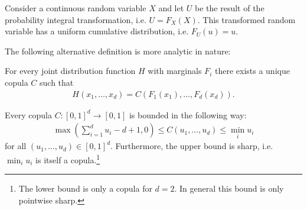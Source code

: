     \begin{property}
        Consider a continuous random variable $X$ and let $U$ be the result of the probability integral transformation, i.e. $U = F_X(X)$. This transformed random variable has a uniform cumulative distribution, i.e. $F_U(u) = u$.
    \end{property}

    The following alternative definition is more analytic in nature:

    \begin{theorem}[Sklar]
        For every joint distribution function $H$ with marginals $F_i$ there exists a unique copula $C$ such that
        \begin{gather}
            H(x_1,\ldots,x_d) = C(F_1(x_1),\ldots,F_d(x_d)).
        \end{gather}
    \end{theorem}

    \begin{property}
        Every copula $C:[0,1]^d\rightarrow[0,1]$ is bounded in the following way:
        \begin{gather}
            \max\left(\sum_{i=1}^du_i-d+1,0\right)\leq C(u_1,\ldots,u_d)\leq \min_iu_i
        \end{gather}
        for all $(u_1,\ldots,u_d)\in[0,1]^d$. Furthermore, the upper bound is sharp, i.e. $\min_iu_i$ is itself a copula.\footnote{The lower bound is only a copula for $d=2$. In general this bound is only pointwise sharp.}
    \end{property}

